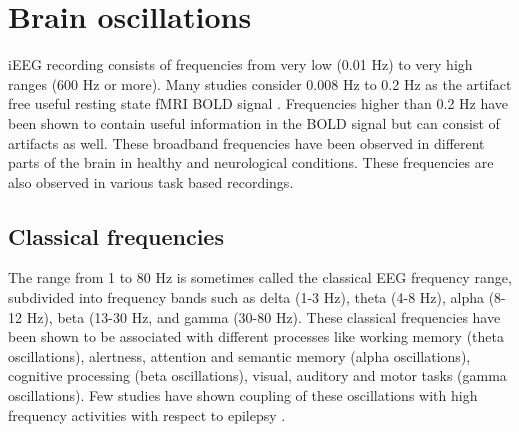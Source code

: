 \section{Brain oscillations}
iEEG recording consists of frequencies from very low (0.01 Hz) to very high ranges (600 Hz or more). Many studies consider 0.008 Hz to 0.2 Hz as the artifact free useful resting state fMRI BOLD signal \citep{deramus2020modular}. Frequencies higher than 0.2 Hz have been shown to contain useful information in the BOLD signal but can consist of artifacts as well. These broadband frequencies have been observed in different parts of the brain in healthy and neurological conditions. These frequencies are also observed in various task based recordings. 

\subsection{Classical frequencies}
The range from 1 to 80 Hz is sometimes called the classical EEG frequency range, subdivided into frequency bands such as delta (1-3 Hz), theta (4-8 Hz), alpha (8-12 Hz), beta (13-30 Hz, and gamma (30-80 Hz). These classical frequencies have been shown to be associated with different processes like working memory (theta oscillations), alertness, attention and semantic memory (alpha oscillations), cognitive processing (beta oscillations), visual, auditory and motor tasks (gamma oscillations). Few studies have shown coupling of these oscillations with high frequency activities with respect to epilepsy \citep{hashimoto2020coupling, hashimoto2021phase}.

